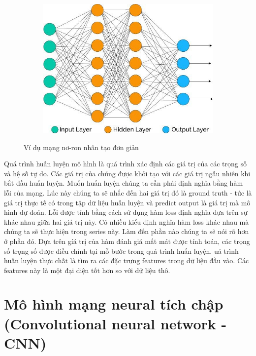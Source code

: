\begin{figure}
    \begin{subfigure}{0.5\textwidth}
        \includegraphics[width=1.0\linewidth]{Chapters/items/ann.jpg}
         
        \label{fig: ann}
    \end{subfigure}
    \caption{Ví dụ mạng nơ-ron nhân tạo đơn giản}
\end{figure}


Quá trình huấn luyện mô hình là quá trình xác định các giá trị của
các trọng số và hệ số tự do. Các giá trị của chúng được khởi tạo với
các giá trị ngẫu nhiên khi bắt đầu huấn luyện. Muốn huấn luyện chúng
ta cần phải định nghĩa bằng hàm lỗi của mạng. Lúc này chúng ta
sẽ nhắc đến hai giá trị đó là ground truth - tức là giá trị
thực tế có trong tập dữ liệu huấn luyện và predict output là
giá trị mà mô hình dự đoán. Lỗi được tính bằng cách sử dụng
hàm loss định nghĩa dựa trên sự khác nhau giữa hai giá trị này.
Có nhiều kiểu định nghĩa hàm loss khác nhau mà chúng ta sẽ thực
hiện trong series này. Làm đến phần nào chúng ta sẽ nói rõ hơn ở
phần đó. Dựa trên gíá trị của hàm đánh giá mất mát được tính toán, các trọng
số trọng số được điều chỉnh tại mỗ bước trong quá trình huấn luyện.
uá trình huấn luyện thực chất là tìm ra các đặc trưng features trong
dữ liệu đầu vào. Các features này là một đại diện tốt hơn so với dữ
liệu thô.


\section{Mô hình mạng neural tích chập (Convolutional neural network - CNN)}

